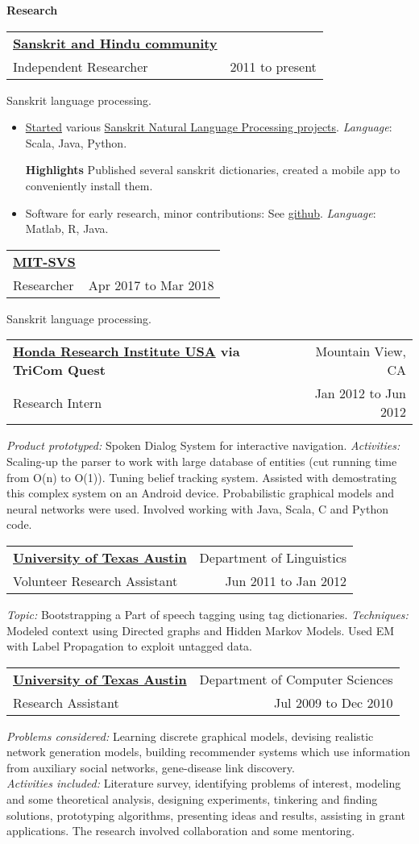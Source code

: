 \documentclass[biblist]{article}
\makeatletter
\renewcommand{\section}[1]{
\phantomsection%
\addcontentsline{toc}{chapter}{#1}%
\pagebreak[3]%
\hyphenpenalty=10000%
\vspace{0.75\baselineskip}%
\raggedright{\colorbox{mygrey}{\textbf{#1}}}%
\\\vspace{-0.7\baselineskip}\hrulefill%
}
\newcommand{\resheading}[4]{
\begin{tabular*}{\columnwidth}{@{}l@{\extracolsep{\fill}}r@{}}
\textbf{#1} & #2 \\
#3 & #4 \\
\end{tabular*}}
\newcommand{\headeditem}[1]{
    \item\textbf{#1}  }
\newcommand{\headedsubitem}[1]{
    \subitem\textbf{#1}  }
\makeatother
\begin{document}
\section{Research}
\resheading{\href{}{Sanskrit and Hindu community}}
{}
{Independent Researcher}
{2011 to present}
Sanskrit language processing.
\begin{itemize}
\headeditem{} \href{https://sanskrit-coders.github.io/site/}{Started} various \href{https://github.com/sanskrit-coders/}{Sanskrit Natural Language Processing projects}. \textit{Language}: Scala, Java, Python.
\headedsubitem{Highlights} Published several sanskrit dictionaries, created a mobile app to conveniently install them.
\headeditem{}Software for early research, minor contributions: See \href{https://github.com/vvasuki}{github}. \textit{Language}: Matlab, R, Java.
\end{itemize}

\resheading{\href{}{MIT-SVS}}
{}
{Researcher}
{Apr 2017 to Mar 2018}
Sanskrit language processing.

\resheading{\href{http://www.honda-ri.com/HRI_Us/}{Honda Research Institute USA} via TriCom Quest}
{Mountain View, CA}
{Research Intern}
{Jan 2012 to Jun 2012}
\textit{Product prototyped:} Spoken Dialog System for interactive navigation.
\textit{Activities:} Scaling-up the parser to work with large database of entities (cut running time from O(n) to O(1)).
Tuning belief tracking system. Assisted with demostrating this complex system on an Android device. Probabilistic graphical models and neural networks were used. Involved working with Java, Scala, C and Python code.

\resheading{\href{http://www.cs.utexas.edu}{University of Texas Austin}}
{Department of Linguistics}
{Volunteer Research Assistant}
{Jun 2011 to Jan 2012}
\textit{Topic:} Bootstrapping a Part of speech tagging using tag dictionaries.
\textit{Techniques:} Modeled context using Directed graphs and Hidden Markov Models. Used EM with Label Propagation to exploit untagged data.

\resheading{\href{http://www.cs.utexas.edu}{University of Texas Austin}}
{Department of Computer Sciences}
{Research Assistant}
{Jul 2009 to Dec 2010}
\textit{Problems considered:} Learning discrete graphical models, devising realistic network generation models, building recommender systems which use information from auxiliary social networks, gene-disease link discovery. \\
\textit{Activities included:} Literature survey, identifying problems of interest, modeling and some theoretical analysis, designing experiments, tinkering and finding solutions, prototyping algorithms, presenting ideas and results, assisting in grant applications. The research involved collaboration and some mentoring.
\end{document}
